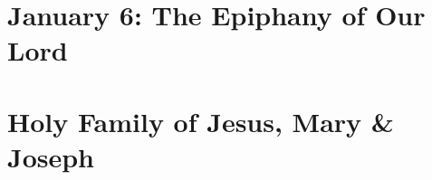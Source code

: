 {{\section{January 6: The Epiphany of Our Lord}
\subtitle{ Class}

\subtitle{I \& II Vespers}

\def\definevesperspropersalt{}
\def\definevesperspropers{}
\def\vesperspropersaltnote{At I Vespers:}
\def\vesperspropersnote{At II Vespers:}
\def\prechapter{\vspace{-1\baselineskip}}
\def\beginchaptercols{\begin{parcolumns}[rulebetween,colwidths={1=0.42\linewidth}]{2}}


\benedicamusdomino{}
}

{
\section{Holy Family of Jesus, Mary \& Joseph}
\subtitle{ Class}

\subtitle{First Sunday after the Epiphany.}


\benedicamusdomino[2]{}
}

}
